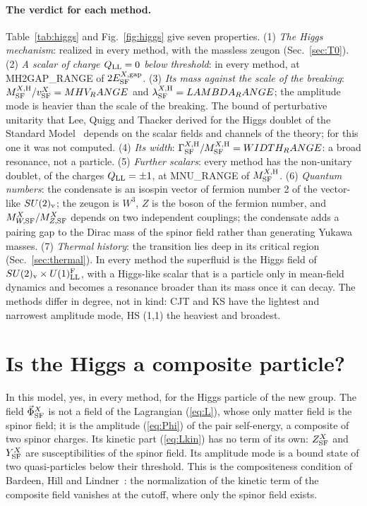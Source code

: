 \documentclass[aps,prd,twocolumn,superscriptaddress,nofootinbib,floatfix,longbibliography]{revtex4-2}
\newcommand{\LL}{{\rm LL}}
\newcommand{\SF}{{\rm SF}}
\begin{document}
\paragraph*{The verdict for each method.}
Table~\ref{tab:higgs} and Fig.~\ref{fig:higgs} give seven properties.
(1) \emph{The Higgs mechanism}: realized in every method, with the massless zeugon (Sec.~\ref{sec:T0}).
(2) \emph{A scalar of charge $Q_\LL=0$ below threshold}: in every method, at {{MH2GAP_RANGE}} of $2E^{X,{\rm gap}}_\SF$.
(3) \emph{Its mass against the scale of the breaking}: $M^{X,{\rm H}}_\SF/v^X_\SF={{MHV_RANGE}}$ and
$\lambda^{X,{\rm H}}_\SF={{LAMBDA_RANGE}}$; the amplitude mode is heavier than the scale of the breaking. The bound of
perturbative unitarity that Lee, Quigg and Thacker derived for the Higgs doublet of the Standard Model~\cite{LQT1977}
depends on the scalar fields and channels of the theory; for this one it was not computed.
(4) \emph{Its width}: $\Gamma^{X,{\rm H}}_\SF/M^{X,{\rm H}}_\SF={{WIDTH_RANGE}}$: a broad resonance, not a particle.
(5) \emph{Further scalars}: every method has the non-unitary doublet, of the charges $Q_\LL=\pm1$, at {{MNU_RANGE}} of
$M^{X,{\rm H}}_\SF$.
(6) \emph{Quantum numbers}: the condensate is an isospin vector of fermion number 2 of the vector-like $SU(2)_{\rm v}$; the
zeugon is $W^3$, $Z$ is the boson of the fermion number, and $M^X_{W,\SF}/M^X_{Z,\SF}$ depends on two independent
couplings; the condensate adds a pairing gap to the Dirac mass of the spinor field rather than generating Yukawa masses.
(7) \emph{Thermal history}: the transition lies deep in its critical region (Sec.~\ref{sec:thermal}).
In every method the superfluid is the Higgs field of $SU(2)_{\rm v}\times U(1)^{\rm F}_\LL$, with a Higgs-like scalar that is
a particle only in mean-field dynamics and becomes a resonance broader than its mass once it can decay. The methods differ
in degree, not in kind: CJT and KS have the lightest and narrowest amplitude mode, HS (1,1) the heaviest and broadest.

\section{Is the Higgs a composite particle?}
\label{sec:composite}

In this model, yes, in every method, for the Higgs particle of the new group. The field $\vec\Phi^X_\SF$ is not a field of
the Lagrangian (\ref{eq:L}), whose only matter field is the spinor field; it is the amplitude (\ref{eq:Phi}) of the pair
self-energy, a composite of two spinor charges. Its kinetic part (\ref{eq:Lkin}) has no term of its own: $Z^X_\SF$ and
$Y^X_\SF$ are susceptibilities of the spinor field. Its amplitude mode is a bound state of two quasi-particles below their
threshold. This is the compositeness condition of Bardeen, Hill and Lindner~\cite{BHL1990}: the normalization of the kinetic
term of the composite field vanishes at the cutoff, where only the spinor field exists.
\end{document}
